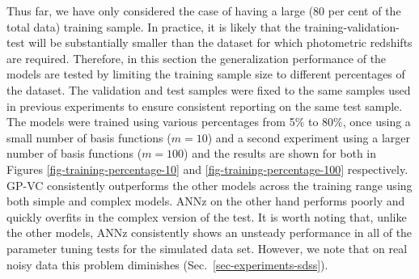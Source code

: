 \documentclass[useAMS,usenatbib,fleqn]{mn2e}
\begin{document}
Thus far, we have only considered the case of having a large (80 per cent of the total data) training sample. In practice, it is likely that the training-validation-test will be substantially smaller than the dataset for which photometric redshifts are required. Therefore, in this section the generalization performance of the models are tested by limiting the training sample size to different percentages of the dataset. The validation and test samples were fixed to the same samples used in previous experiments to ensure consistent reporting on the same test sample. The models were trained using various percentages from 5\% to 80\%, once using a small number of basis functions ($m=10$) and a second experiment using a larger number of basis functions ($m=100$) and the results are shown for both in Figures \ref{fig-training-percentage-10} and \ref{fig-training-percentage-100} respectively. GP-VC consistently outperforms the other models across the training range using both simple and complex models. {ANNz} on the other hand performs poorly and quickly overfits in the complex version of the test. It is worth noting that, unlike the other models, {ANNz} consistently shows an unsteady performance in all of the parameter tuning tests for the simulated data set. However, we note that on real noisy data this problem diminishes (Sec.~\ref{sec-experiments-sdss}).
\end{document}
